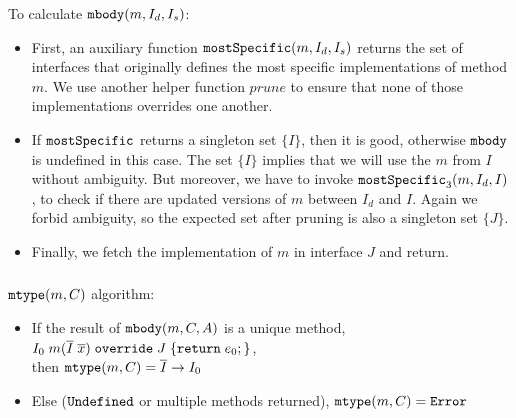 To calculate $\texttt{mbody}(m, I_d, I_s)$:
\begin{itemize}
	\item First, an auxiliary function $\texttt{mostSpecific}(m, I_d, I_s)$ returns the set of interfaces that
	originally defines the most specific implementations of method $m$. We use another helper function $prune$ to ensure that none of those implementations overrides one another.
	\item If $\texttt{mostSpecific}$ returns a singleton set $\{I\}$, then it is good, otherwise $\texttt{mbody}$ is undefined in
	this case. The set $\{I\}$ implies that we will use the $m$ from $I$ without ambiguity. But moreover, we have to invoke $\texttt{mostSpecific}_3(m, I_d, I)$, to check if there are updated versions of $m$ between $I_d$ and $I$. Again we forbid ambiguity, so the expected set after pruning is also a singleton set $\{J\}$.
	\item Finally, we fetch the implementation of $m$ in interface $J$ and return.
\end{itemize}

\begin{comment}
$mbody(m, I)$ algorithm:
\begin{itemize}
	\item If m is defined in I directly, then return I.m()
	\item Else, let $\overline{I'} = mdefined(fathers(I))$, all ancestors of $I$ that has directly defined $m()$.
	\item $\overline{I''} = needed(\overline{I'})$, keep only interfaces that are needed, which are not super-interface of others.
	\item If $\overline{I''}$ is unique, then return this unique one. Else if any two I1,I2 in $\overline{I''}$ share a parent in $\overline{I'}$, then diamond conflict is detected, report error. Else return multiple $m()$s.
\end{itemize}
\end{comment}

\subsubsection{\mostSpecific}


\subsubsection{\mtype}
$\texttt{mtype}(m, C)$ algorithm:
\begin{itemize}
	\item If the result of $\texttt{mbody}(m, C, A)$ is a unique method,\\
	$I_0 \; m (\overline{I} \; \overline{x}) \; \texttt{override} \; J \; {\{} \texttt{return} \; e_0 ; {\}}$,\\
	then $\texttt{mtype}(m, C) = \overline{I} \to I_0$
	\item Else ($\texttt{Undefined}$ or multiple methods returned), $\texttt{mtype}(m, C) = \texttt{Error}$
\end{itemize}



